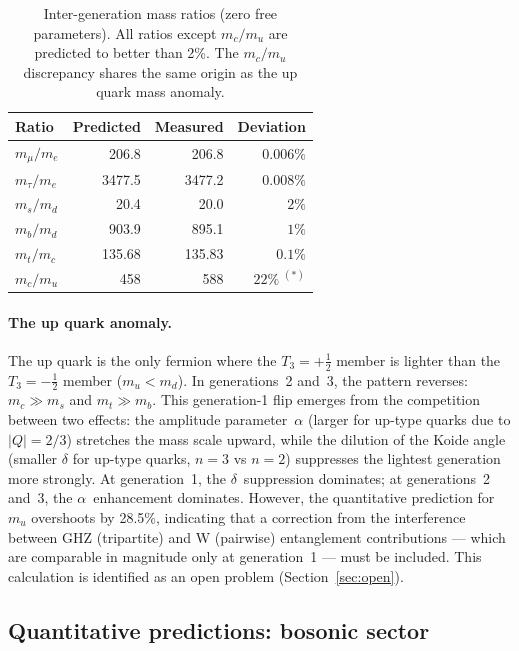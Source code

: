 \documentclass{article}
\begin{document}
\begin{table}[t]
  \centering
  \caption{Inter-generation mass ratios (zero free parameters). All ratios except $m_c/m_u$ are predicted to better than 2\%. The $m_c/m_u$ discrepancy shares the same origin as the up quark mass anomaly.}
  \label{tab:ratios}
  \begin{tabular}{lrrr}
    \toprule
    Ratio & Predicted & Measured & Deviation \\
    \midrule
    $m_\mu / m_e$ & 206.8 & 206.8 & $0.006\%$ \\
    $m_\tau / m_e$ & 3477.5 & 3477.2 & $0.008\%$ \\[4pt]
    $m_s / m_d$ & 20.4 & 20.0 & $2\%$ \\
    $m_b / m_d$ & 903.9 & 895.1 & $1\%$ \\[4pt]
    $m_t / m_c$ & 135.68 & 135.83 & $0.1\%$ \\
    $m_c / m_u$ & 458 & 588 & $22\%\;^{(*)}$ \\
    \bottomrule
  \end{tabular}
\end{table}

\paragraph{The up quark anomaly.} The up quark is the only fermion where the $T_3 = +\tfrac{1}{2}$ member is lighter than the $T_3 = -\tfrac{1}{2}$ member ($m_u < m_d$). In generations~2 and~3, the pattern reverses: $m_c \gg m_s$ and $m_t \gg m_b$. This generation-1 flip emerges from the competition between two effects: the amplitude parameter~$\alpha$ (larger for up-type quarks due to $|Q| = 2/3$) stretches the mass scale upward, while the dilution of the Koide angle (smaller $\delta$ for up-type quarks, $n = 3$ vs $n = 2$) suppresses the lightest generation more strongly. At generation~1, the $\delta$~suppression dominates; at generations~2 and~3, the $\alpha$~enhancement dominates. However, the quantitative prediction for $m_u$ overshoots by 28.5\%, indicating that a correction from the interference between GHZ (tripartite) and W (pairwise) entanglement contributions --- which are comparable in magnitude only at generation~1 --- must be included. This calculation is identified as an open problem (Section~\ref{sec:open}).

\subsection{Quantitative predictions: bosonic sector}
\end{document}
